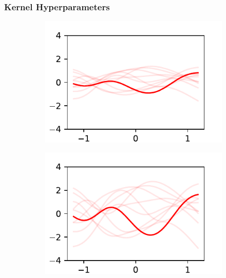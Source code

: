 \documentclass{beamer}
\begin{document}
\begin{frame}
    \frametitle{Kernel Hyperparameters}
    \begin{figure}[htbp]
        \centering
        \begin{subfigure}[b]{0.4\textwidth}
            \centering
            \includegraphics[width=\textwidth]{GP_ell_5_sigma2_5_tenths.pdf}
            \label{fig:half_half}
        \end{subfigure}%
        \begin{subfigure}[b]{0.4\textwidth}
            \centering
            \includegraphics[width=\textwidth]{GP_ell_5_sigma2_20_tenths.pdf}
            \label{fig:half_two}
        \end{subfigure}

\end{figure}
\end{frame}
\end{document}
